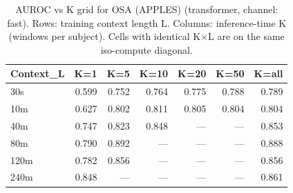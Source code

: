 \begin{table}[ht]
\centering
\caption{AUROC vs K grid for OSA (APPLES) (transformer, channel: fast). Rows: training context length L. Columns: inference-time K (windows per subject). Cells with identical K×L are on the same iso-compute diagonal.}
\label{tab:kgrid_osa_binary_apples_postqc_transformer_fast}
\begin{tabular}{lrrrrrr}
\toprule
Context_L & K=1 & K=5 & K=10 & K=20 & K=50 & K=all \\
\midrule
30s & 0.599 & 0.752 & 0.764 & 0.775 & 0.788 & 0.789 \\
10m & 0.627 & 0.802 & 0.811 & 0.805 & 0.804 & 0.804 \\
40m & 0.747 & 0.823 & 0.848 & — & — & 0.853 \\
80m & 0.790 & 0.892 & — & — & — & 0.888 \\
120m & 0.782 & 0.856 & — & — & — & 0.856 \\
240m & 0.848 & — & — & — & — & 0.861 \\
\bottomrule
\end{tabular}
\end{table}